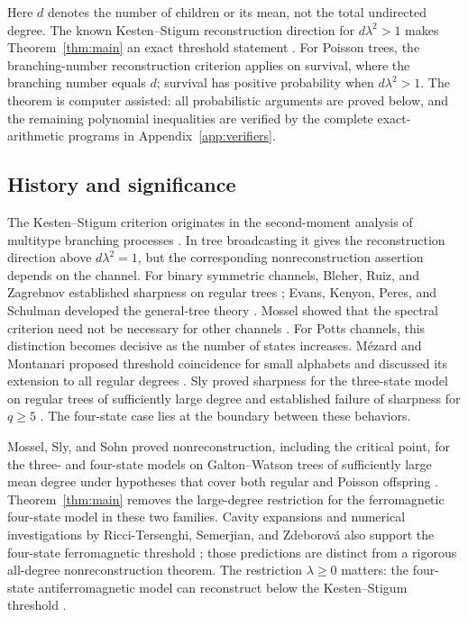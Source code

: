 Here $d$ denotes the number of children or its mean, not the total
undirected degree. The known Kesten--Stigum reconstruction direction for
$d\lambda^2>1$ makes Theorem~\ref{thm:main} an exact threshold statement
\cite{KestenStigum1966,MosselPeres2003,Lyons1990}. For Poisson trees,
the branching-number reconstruction criterion applies on survival,
where the branching number equals $d$; survival has positive probability
when $d\lambda^2>1$.
The theorem is computer assisted: all probabilistic arguments are proved
below, and the remaining polynomial inequalities are verified by the
complete exact-arithmetic programs in Appendix~\ref{app:verifiers}.

\subsection{History and significance}
The Kesten--Stigum criterion originates in the second-moment analysis of
multitype branching processes \cite{KestenStigum1966}. In tree broadcasting it gives the
reconstruction direction above $d\lambda^2=1$, but the corresponding
nonreconstruction assertion depends on the channel. For binary symmetric
channels, Bleher, Ruiz, and Zagrebnov established sharpness on regular
trees \cite{BleherRuizZagrebnov1995}; Evans, Kenyon, Peres, and Schulman
developed the general-tree theory
\cite{EvansKenyonPeresSchulman2000}. Mossel showed that the spectral
criterion need not be necessary for other channels \cite{Mossel2001}.
For Potts channels, this distinction becomes decisive as the number of
states increases. M\'ezard and Montanari proposed threshold coincidence
for small alphabets and discussed its extension to all regular degrees
\cite[Section~8]{MezardMontanari2006}.
Sly proved sharpness for the three-state model on regular trees of
sufficiently large degree and established failure of sharpness for
$q\geq5$ \cite{Sly2011}. The four-state case lies at the boundary between
these behaviors.

Mossel, Sly, and Sohn proved nonreconstruction, including the critical
point, for the three- and four-state models on Galton--Watson trees of
sufficiently large mean degree under hypotheses that cover both regular
and Poisson offspring \cite{MosselSlySohn2025}.
Theorem~\ref{thm:main} removes the large-degree restriction for the
ferromagnetic four-state model in these two families. Cavity expansions
and numerical investigations by Ricci-Tersenghi, Semerjian, and
Zdeborov\'a also support the four-state ferromagnetic threshold
\cite{RicciTersenghiSemerjianZdeborova2019}; those predictions are distinct
from a rigorous all-degree nonreconstruction theorem. The restriction
$\lambda\geq0$ matters: the four-state antiferromagnetic model can
reconstruct below the Kesten--Stigum threshold
\cite{MosselSlySohn2025}.

